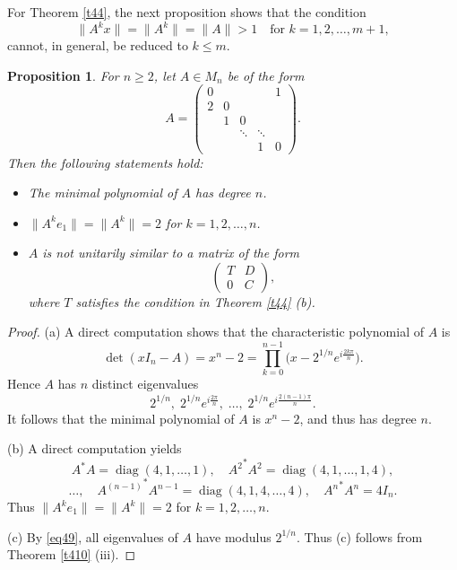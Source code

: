 \documentclass[11pt]{article}
\newtheorem{proposition}[theorem]{Proposition}
\numberwithin{equation}{section}
\begin{document}
For Theorem \ref{t44}, the next proposition shows that the condition
\[
\|A^k x\| = \|A^k\| = \|A\| > 1 \quad \mbox{for } k=1,2,\ldots,m+1,
\]
cannot, in general, be reduced to $k \le m$.

\begin{proposition}\label{prop48}
For $n \ge 2$, let $A \in M_n$ be of the form
\[
A =
\begin{pmatrix}
0 &        &        &        & 1\\
2 & 0      &        &        &  \\
  & 1      & 0      &        &  \\
  &        & \ddots & \ddots &  \\
  &        &        & 1      & 0
\end{pmatrix}.
\]
Then the following statements hold:
\begin{itemize}
\item[\rm (a)] The minimal polynomial of $A$ has degree $n$.

\item[\rm (b)] $\|A^k e_1\| = \|A^k\| = 2$ for $k=1,2,\ldots,n$.

\item[\rm (c)] $A$ is not unitarily similar to a matrix of the form
\[
\begin{pmatrix}
T & D\\
0 & C
\end{pmatrix},
\]
where $T$ satisfies the condition in Theorem \ref{t44} (b).
\end{itemize}
\end{proposition}

\begin{proof}
(a) A direct computation shows that the characteristic polynomial of $A$ is
\[
\det(xI_n-A) = x^n - 2
= \prod_{k=0}^{n-1} \bigl(x - 2^{1/n} e^{i\frac{2k\pi}{n}}\bigr).
\]
Hence $A$ has $n$ distinct eigenvalues
\begin{equation}\label{eq49}
2^{1/n},\; 2^{1/n} e^{i\frac{2\pi}{n}},\; \ldots,\;
2^{1/n} e^{i\frac{2(n-1)\pi}{n}}.
\end{equation}
It follows that the minimal polynomial of $A$ is $x^n - 2$, and thus has degree $n$.

\medskip

(b) A direct computation yields
\[
A^*A = \operatorname{diag}(4,1,\ldots,1), \quad
{A^2}^*A^2 = \operatorname{diag}(4,1,\ldots,1,4),
\]
\[
\ldots, \quad
{A^{(n-1)}}^*A^{n-1} = \operatorname{diag}(4,1,4,\ldots,4), \quad
{A^n}^*A^n = 4I_n.
\]
Thus
 $\|A^k e_1\| = \|A^k\| = 2$ for $k=1,2,\ldots,n$.

\medskip

(c) By \eqref{eq49}, all eigenvalues of $A$ have modulus $2^{1/n}$.
Thus (c) follows from Theorem \ref{t410} (iii).
\end{proof}
\end{document}

